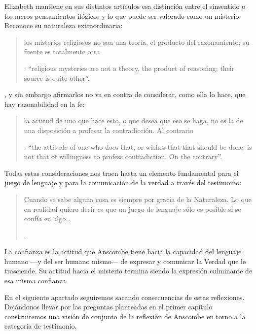 Elizabeth mantiene en sus distintos artículos esa distinción entre el sinsentido o los meros pensamientos ilógicos y lo que puede ser valorado como un misterio. Reconoce su naturaleza extraordinaria: \blockquote[{\Cite[122-123]{anscombe1981parmenides:qli}}: \enquote{religious mysteries are not a theory, the product of reasoning; their source is quite other}.]{los misterios religiosos no son una teoría, el producto del razonamiento; su fuente es totalmente otra}, y sin embargo afirmarlos no va en contra de considerar, como ella lo hace, que hay razonabilidad en la fe: \blockquote[{\Cite[122]{anscombe1981parmenides:qli}}: \enquote{the attitude of one who does that, or wishes that that should be done, is not that of willingness to profess contradiction. On the contrary}.]{la actitud de uno que hace esto, o que desea que eso se haga, no es la de una disposición a profesar la contradicción. Al contrario}.

Todas estas consideraciones nos traen hasta un elemento fundamental para el juego de lenguaje y para la comunicación de la verdad a través del testimonio: \blockquote[{\Cite[\S505; 509]{wittgenstein1969oncertes}}.]{Cuando se sabe alguna cosa es siempre por gracia de la Naturaleza. \textelp{} Lo que en realidad quiero decir es que un juego de lenguaje sólo es posible si se confía en algo\ldots}. La confianza es la actitud que Anscombe tiene hacia la capacidad del lenguaje humano ---y del ser humano mismo--- de expresar y comunicar la Verdad que le trasciende. Su actitud hacia el misterio termina siendo la expresión culminante de esa misma confianza.

En el siguiente apartado seguiremos sacando consecuencias de estas reflexiones. Dejándonos llevar por las preguntas planteadas en el primer capítulo construiremos una visión de conjunto de la reflexión de Anscombe en torno a la categoría de testimonio.

